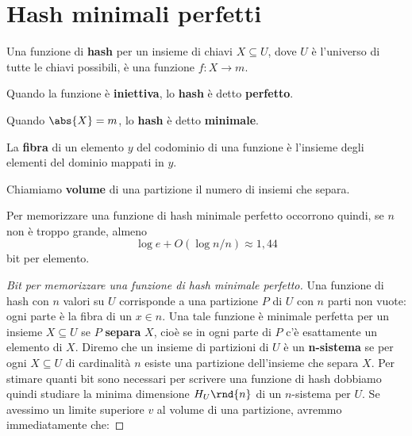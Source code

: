 \documentclass[\main/main.tex]{subfiles}
\begin{document}
\section{Hash minimali perfetti}
\begin{multicols}{2}
\begin{definition}[Hash]
    Una funzione di \textbf{hash} per un insieme di chiavi \(X \subseteq U\), dove \(U\) è l'universo di tutte le chiavi possibili, è una funzione \(f: X \rightarrow m\).
\end{definition}
\begin{definition}
    Quando la funzione è \textbf{iniettiva}, lo \textbf{hash} è detto \textbf{perfetto}.
\end{definition}
\begin{definition}
    Quando \(\abs{X} = m\), lo \textbf{hash} è detto \textbf{minimale}. 
\end{definition}
\begin{definition}[Fibra]
    La \textbf{fibra} di un elemento \(y\) del codominio di una funzione è l'insieme degli elementi del dominio mappati in \(y\).
\end{definition}
\begin{definition}
    Chiamiamo \textbf{volume} di una partizione il numero di insiemi che separa.
\end{definition}
\begin{lemma}
    Per memorizzare una funzione di hash minimale perfetto occorrono quindi, se \(n\) non è troppo grande, almeno
    \[
        \log e+O(\log n / n) \approx 1,44
    \]
    bit per elemento.
\end{lemma}
\vfill\null
\columnbreak
\begin{proof}[Bit per memorizzare una funzione di hash minimale perfetto]
    Una funzione di hash con \(n\) valori su \(U\) corrisponde a una partizione \(P\) di \(U\) con \(n\) parti non vuote: ogni parte è la fibra di un \(x \in n\). Una tale funzione è minimale perfetta per un insieme \(X \subseteq U\) se \(P\) \textbf{separa} \(X\), cioè se in ogni parte di \(P\) c'è esattamente un elemento di \(X\). Diremo che un insieme di partizioni di \(U\) è un \textbf{n-sistema} se per ogni \(X \subseteq U\) di cardinalità \(n\) esiste una partizione dell'insieme che separa \(X\). Per stimare quanti bit sono necessari per scrivere una funzione di hash dobbiamo quindi studiare la minima dimensione \(H_U\rnd{n}\) di un \(n\)-sistema per \(U\). Se avessimo un limite superiore \(v\) al volume di una partizione, avremmo immediatamente che:

\end{proof}
\end{multicols}
\end{document}
